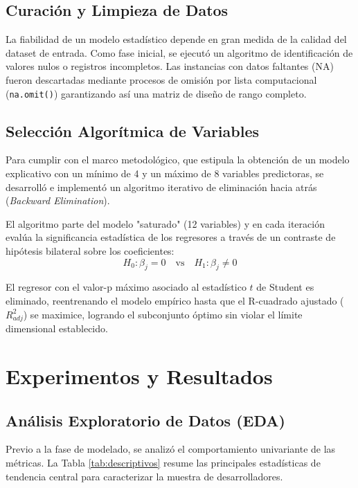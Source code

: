 \documentclass[procedia]{easychair}
\begin{document}
\subsection{Curación y Limpieza de Datos}
La fiabilidad de un modelo estadístico depende en gran medida de la calidad del dataset de entrada. Como fase inicial, se ejecutó un algoritmo de identificación de valores nulos o registros incompletos. Las instancias con datos faltantes (NA) fueron descartadas mediante procesos de omisión por lista computacional (\texttt{na.omit()}) garantizando así una matriz de diseño de rango completo.

\subsection{Selección Algorítmica de Variables}
Para cumplir con el marco metodológico, que estipula la obtención de un modelo explicativo con un mínimo de 4 y un máximo de 8 variables predictoras, se desarrolló e implementó un algoritmo iterativo de eliminación hacia atrás (\textit{Backward Elimination}). 

El algoritmo parte del modelo "saturado" (12 variables) y en cada iteración evalúa la significancia estadística de los regresores a través de un contraste de hipótesis bilateral sobre los coeficientes:
\begin{equation}
H_0: \beta_j = 0 \quad \text{vs} \quad H_1: \beta_j \neq 0
\end{equation}

El regresor con el valor-p máximo asociado al estadístico $t$ de Student es eliminado, reentrenando el modelo empírico hasta que el R-cuadrado ajustado ($R^2_{adj}$) se maximice, logrando el subconjunto óptimo sin violar el límite dimensional establecido.

\section{Experimentos y Resultados}

\subsection{Análisis Exploratorio de Datos (EDA)}
Previo a la fase de modelado, se analizó el comportamiento univariante de las métricas. La Tabla \ref{tab:descriptivos} resume las principales estadísticas de tendencia central para caracterizar la muestra de desarrolladores.
\end{document}
